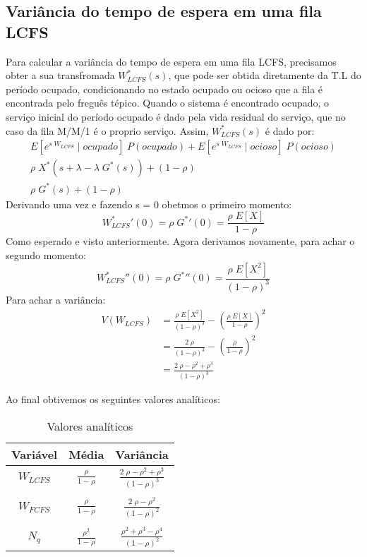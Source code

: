 \documentclass[a4paper]{article}
\newcommand{\E}[1]{E\!\left[#1\right]}
\begin{document}
\subsection{Variância do tempo de espera em uma fila LCFS}
Para calcular a variância do tempo de espera em uma fila LCFS, precisamos obter
a sua transfromada \(W_{LCFS}^*(s)\), que pode ser obtida diretamente da T.L
do período ocupado, condicionando no estado ocupado ou ocioso que a fila  é encontrada pelo freguês tépico.
Quando o sistema é encontrado ocupado, o serviço inicial do período ocupado  é dado pela vida residual do
serviço, que no caso da fila M/M/1 é o proprio serviço.
Assim, \(W_{LCFS}^*(s)\) é dado por:
\begin{align*}
    \E{e^{s \; W_{LCFS}} \;|\; ocupado} \; P(ocupado)
        + \E{e^{s \; W_{LCFS}} \;|\; ocioso} \; P(ocioso) \\
    \rho \; X^*(s + \lambda - \lambda \; G^*(s)) + (1 - \rho) \\
    \rho \; G^*(s) + (1 - \rho)
\end{align*}
Derivando uma vez e fazendo s = 0 obetmos o primeiro momento:
\[
    {W_{LCFS}^*}'(0)
        = \rho \; {G^*}'(0) = \frac{\rho \; \E{X}}{1 - \rho}
\]
Como esperado e visto anteriormente. Agora derivamos novamente, para achar o segundo momento:
\[
    {W_{LCFS}^*}''(0)
        = \rho \; {G^*}''(0)
        = \frac{\rho \; \E{X^2}}{(1 - \rho)^3}
\]
Para achar a variância:
\begin{align*}
    V(W_{LCFS}) &=
        \frac{\rho \; \E{X^2}}{(1 - \rho)^3}
        - \left( \frac{\rho \; \E{X}}{1-\rho} \right)^2 \\
    &= \frac{2 \; \rho}{(1 - \rho)^3}
        - \left( \frac{\rho}{1 - \rho} \right)^2 \\
    &= \frac{2 \; \rho - \rho^2 + \rho^3}{(1 - \rho)^3}
\end{align*}

Ao final obtivemos os seguintes valores analíticos:
\begin{table}[h]
    \centering
    \begin{tabular}{|c|cc|}\hline
        Variável & Média & Variância \\\hline
        $ W_{LCFS} $&$ \frac{\rho}{1-\rho} $&$
            \frac{2 \; \rho - \rho^2 + \rho^3}{(1-\rho)^3} $\\&&\\
        $ W_{FCFS} $&$ \frac{\rho}{1-\rho} $&$
            \frac{2 \; \rho - \rho^2}{(1 - \rho)^2} $\\&&\\
        $ N_q      $&$ \frac{\rho^2}{1 - \rho} $&$
            \frac{\rho^2 + \rho^3 - \rho^4}{(1 - \rho)^2} $\\\hline
    \end{tabular}
    \caption{Valores analíticos}
\end{table}
\end{document}
